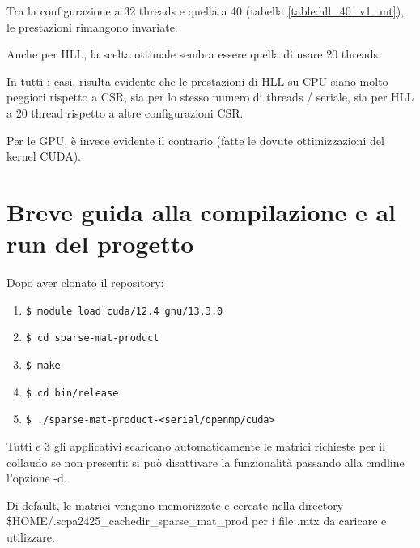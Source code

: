 \documentclass[a4paper,9pt]{extarticle}
\begin{document}
Tra la configurazione a 32 threads e quella a 40 (tabella \ref{table:hll_40_v1_mt}), le prestazioni
rimangono invariate.

Anche per HLL, la scelta ottimale sembra essere quella di usare 20 threads.

In tutti i casi, risulta evidente che le prestazioni di HLL su CPU siano molto peggiori rispetto
a CSR, sia per lo stesso numero di threads / seriale, sia per HLL a 20 thread rispetto a altre 
configurazioni CSR.

Per le GPU, è invece evidente il contrario (fatte le dovute ottimizzazioni del kernel CUDA).

\section{Breve guida alla compilazione e al run del progetto}

Dopo aver clonato il repository:

\begin{enumerate}
	\item 
\begin{lstlisting}
$ module load cuda/12.4 gnu/13.3.0
\end{lstlisting}

	\item 
\begin{lstlisting}
$ cd sparse-mat-product
\end{lstlisting}

	\item 
\begin{lstlisting}
$ make
\end{lstlisting}

	\item 
\begin{lstlisting}
$ cd bin/release
\end{lstlisting}

	\item 
\begin{lstlisting}
$ ./sparse-mat-product-<serial/openmp/cuda>
\end{lstlisting}
\end{enumerate}

Tutti e 3 gli applicativi scaricano automaticamente le matrici richieste per il 
collaudo se non presenti: si può disattivare la funzionalità passando alla cmdline
l'opzione -d. 

Di default, le matrici vengono memorizzate e cercate nella directory \\
\$HOME/.scpa2425\_cachedir\_sparse\_mat\_prod per i file .mtx da caricare e utilizzare.
\end{document}
